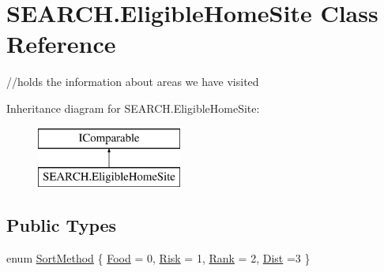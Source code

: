 \hypertarget{class_s_e_a_r_c_h_1_1_eligible_home_site}{\section{S\-E\-A\-R\-C\-H.\-Eligible\-Home\-Site Class Reference}
\label{class_s_e_a_r_c_h_1_1_eligible_home_site}
}


//holds the information about areas we have visited  


Inheritance diagram for S\-E\-A\-R\-C\-H.\-Eligible\-Home\-Site\-:\begin{figure}[H]
\begin{center}
\leavevmode
\includegraphics[height=2.000000cm]{class_s_e_a_r_c_h_1_1_eligible_home_site}
\end{center}
\end{figure}
\subsection*{Public Types}
\begin{DoxyCompactItemize}
\item 
enum \hyperlink{class_s_e_a_r_c_h_1_1_eligible_home_site_a072bac9d5910ce852eee90462451af81}{Sort\-Method} \{ \hyperlink{class_s_e_a_r_c_h_1_1_eligible_home_site_a072bac9d5910ce852eee90462451af81a0a38e7286ebbb560354992b3ce62be67}{Food} = 0, 
\hyperlink{class_s_e_a_r_c_h_1_1_eligible_home_site_a072bac9d5910ce852eee90462451af81a59ca88f7b0e80cdd9af330af600a9ff6}{Risk} = 1, 
\hyperlink{class_s_e_a_r_c_h_1_1_eligible_home_site_a072bac9d5910ce852eee90462451af81a021da1b20f73dc252361a54d80497ef3}{Rank} = 2, 
\hyperlink{class_s_e_a_r_c_h_1_1_eligible_home_site_a072bac9d5910ce852eee90462451af81a5c19fe9a1d52a0618136405798fc4f5f}{Dist} =3
 \}
\end{DoxyCompactItemize}
